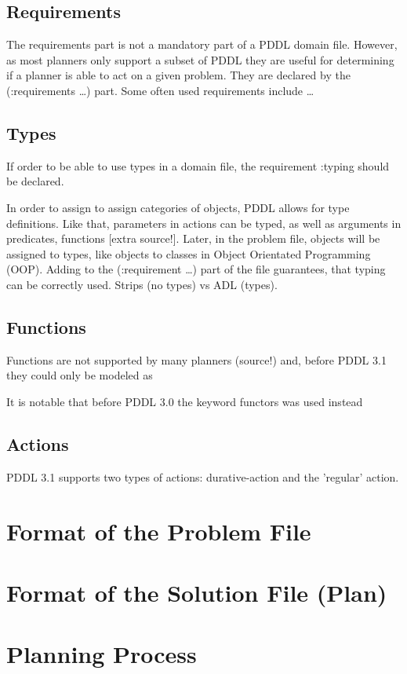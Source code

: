 \documentclass[11pt]{report}
\begin{document}
\subsection{Requirements}
\label{sec-3-1-2}
The requirements part is not a mandatory part of a PDDL domain file.
However, as most planners only support a subset of PDDL they are
useful for determining if a planner is able to act on a given problem.
They are declared by the (:requirements \ldots{}) part. Some often used
requirements include \ldots{}
\subsection{Types}
\label{sec-3-1-3}

If order to be able to use types in a domain file, the
requirement :typing should be declared.

In order to assign to assign categories of objects, PDDL allows for
type definitions. Like that, parameters in actions can be typed, as
well as arguments in predicates, functions [extra source!]. Later, in
the problem file, objects will be assigned to types, like objects to
classes in Object Orientated Programming (OOP). Adding to the
(:requirement \ldots{}) part of the file guarantees, that typing can be
correctly used. Strips (no types) vs ADL (types).


\subsection{Functions}
\label{sec-3-1-4}
Functions are not supported by many planners (source!) and, before
PDDL 3.1 they could only be modeled as 

It is notable that before PDDL 3.0 the keyword functors was used instead
\subsection{Actions}
\label{sec-3-1-5}
PDDL 3.1 supports two types of actions: durative-action and the
'regular' action.
\section{Format of the Problem File}
\label{sec-3-2}
\section{Format of the Solution File (Plan)}
\label{sec-3-3}
\section{Planning Process}
\label{sec-3-4}
\end{document}
